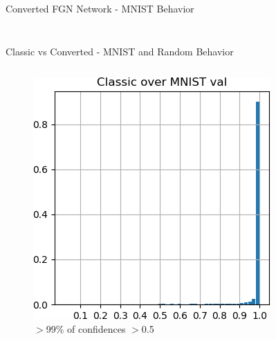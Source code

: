\documentclass{beamer}
\begin{document}
\begin{frame}{Converted FGN Network - MNIST Behavior}
\begin{columns}
\begin{column}{.5\textwidth}
\begin{figure}
        \caption*{}
    \end{figure}
    \end{column}
    \end{columns}
    
    
\end{frame}

\begin{frame}{Classic vs Converted - MNIST and Random Behavior}

    \vspace{-3mm}
    \begin{columns}
    \begin{column}{.33\textwidth}
    \begin{figure}
        \includegraphics[width=.9\textwidth]{images/mnist-behavior/classic-hist-val.png}
        \centering \tiny{$>$99\% of confidences $>$0.5}
    \end{figure}
    \end{column}
    \begin{column}{.33\textwidth}
    \begin{figure}

\end{figure}
\end{column}
\end{columns}
\end{frame}
\end{document}

